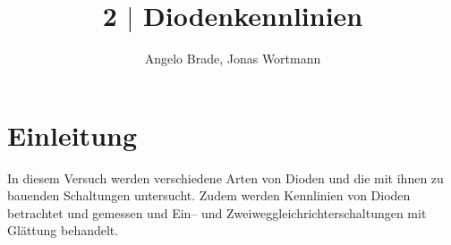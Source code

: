 \documentclass[a4paper,12pt]{article}
\numberwithin{equation}{section}
\begin{document}

\title{2 $|$ Diodenkennlinien}
\author{Angelo Brade, Jonas Wortmann}
\maketitle
{}


\newpage


\fancyhead[L]{\thepage}
\fancyfoot[C]{}

\tableofcontents


\newpage


\fancyhead[R]{\leftmark\\\rightmark}

\section{Einleitung}
In diesem Versuch werden verschiedene Arten von Dioden und die mit ihnen zu bauenden Schaltungen untersucht.
Zudem werden Kennlinien von Dioden betrachtet und gemessen und Ein-- und Zweiweggleichrichterschaltungen mit Glättung behandelt.

\newpage
\end{document}
